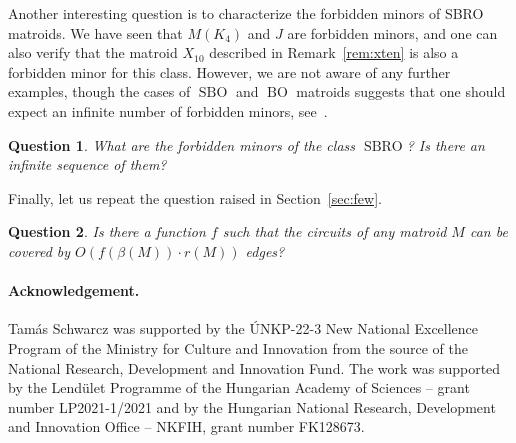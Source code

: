 \documentclass[11pt,a4paper]{article}
\theoremstyle{plain}
\newtheorem{qu}{Question}
\theoremstyle{definition}
\DeclareMathOperator*{\sbo}{SBO}
\DeclareMathOperator*{\bo}{BO}
\DeclareMathOperator*{\sbro}{SBRO}
\begin{document}
Another interesting question is to characterize the forbidden minors of SBRO matroids. We have seen that $M(K_4)$ and $J$ are forbidden minors, and one can also verify that the matroid $X_{10}$ described in Remark~\ref{rem:xten} is also a forbidden minor for this class. However, we are not aware of any further examples, though the cases of $\sbo$ and $\bo$ matroids suggests that one should expect an infinite number of forbidden minors, see~\cite{bonin2016infinite}.

\begin{qu}
What are the forbidden minors of the class $\sbro$? Is there an infinite sequence of them?
\end{qu}

Finally, let us repeat the question raised in Section~\ref{sec:few}.

\begin{qu}
Is there a function $f$ such that the circuits of any matroid $M$ can be covered by $O(f(\beta(M))\cdot r(M))$ edges?
\end{qu}


\paragraph{Acknowledgement.} Tamás Schwarcz was supported by the \'{U}NKP-22-3 New National Excellence Program of the Ministry for Culture and Innovation from the source of the National Research, Development and Innovation Fund. The work was supported by the Lend\"ulet Programme of the Hungarian Academy of Sciences -- grant number LP2021-1/2021 and by the Hungarian National Research, Development and Innovation Office -- NKFIH, grant number FK128673. 



\end{document}
